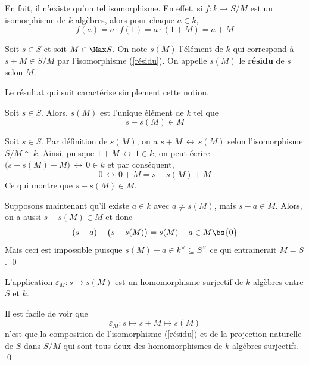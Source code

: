 En fait, il n'existe qu'un tel isomorphisme. En effet, si $f : k \rightarrow S/M$ est un isomorphisme de $k$-algèbres, alors pour chaque $a \in k$,
$$ f(a) = a \cdot f(1) = a \cdot (1 + M) = a+M $$

\begin{Def} Soit $s \in S$ et soit $M \in \Max S$. On note $s(M)$ l'élément de $k$ qui correspond à $s + M \in S/M$ par l'isomorphisme (\ref{résidu}). On appelle $s(M)$ le \textbf{résidu} de $s$ selon $M$. 
\end{Def}

Le résultat qui suit caractérise simplement cette notion.

\begin{Lem} Soit $s \in S$. Alors, $s(M)$ est l'unique élément de $k$ tel que 
$$ s - s(M) \in M $$
\begin{pre} Soit $s \in S$. Par définition de $s(M)$, on a $s + M \, \leftrightarrow \, s(M)$ selon l'isomorphisme $S/M \cong k$. Ainsi, puisque $1+M \, \leftrightarrow \, 1 \in k$, on peut écrire $\big(s - s(M) + M\big) \, \leftrightarrow \, 0 \in k$ et par conséquent,
$$ 0 \, \leftrightarrow \, 0 + M = s-s(M) + M $$
Ce qui montre que $s-s(M) \in M$.

Supposons maintenant qu'il existe $a \in k$ avec $a \neq s(M)$, mais $s-a \in M$. Alors, on a aussi $s-s(M) \in M$ et donc
$$ (s - a) - \big(s - s(M)\big) = s(M) - a \in M \bs \{0\} $$
Mais ceci est impossible puisque $s(M)-a \in k^\times \subseteq S^\times$ ce qui entrainerait $M = S$. \qed
\end{pre}
\end{Lem}

\begin{Cor} L'application $\varepsilon_M : s \mapsto s(M)$ est un homomorphisme surjectif de \linebreak $k$-algèbres entre $S$ et $k$.
\begin{pre} Il est facile de voir que
$$ \varepsilon_M : s \mapsto s + M \mapsto s(M) $$
n'est que la composition de l'isomorphisme (\ref{résidu}) et de la projection naturelle de $S$ dans $S/M$ qui sont tous deux des homomorphismes de $k$-algèbres surjectifs. \qed
\end{pre}
\end{Cor}

